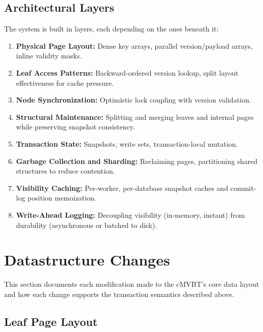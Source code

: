 \documentclass[11pt]{article}
\begin{document}
\subsection{Architectural Layers}

The system is built in layers, each depending on the ones beneath it:

\begin{enumerate}
  \item \textbf{Physical Page Layout:} Dense key arrays, parallel version/payload arrays,
        inline validity masks.

  \item \textbf{Leaf Access Patterns:} Backward-ordered version lookup, split layout
        effectiveness for cache pressure.

  \item \textbf{Node Synchronization:} Optimistic lock coupling with version validation.

  \item \textbf{Structural Maintenance:} Splitting and merging leaves and internal pages
        while preserving snapshot consistency.

  \item \textbf{Transaction State:} Snapshots, write sets, transaction-local mutation.

  \item \textbf{Garbage Collection and Sharding:} Reclaiming pages, partitioning shared
        structures to reduce contention.

  \item \textbf{Visibility Caching:} Per-worker, per-database snapshot caches and commit-log
        position memoization.

  \item \textbf{Write-Ahead Logging:} Decoupling visibility (in-memory, instant) from
        durability (asynchronous or batched to disk).
\end{enumerate}

\newpage

\section{Datastructure Changes}
\label{sec:datastruct}

This section documents each modification made to the cMVBT's core data layout and how each
change supports the transaction semantics described above.

\subsection{Leaf Page Layout}
\end{document}
